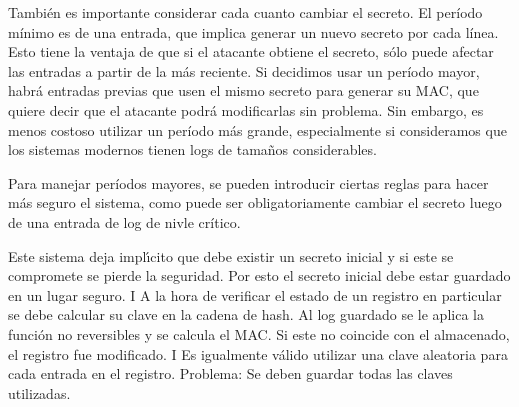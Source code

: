 También es importante considerar cada cuanto cambiar el secreto. El período mínimo es de una entrada, que implica generar un nuevo secreto por cada línea. Esto tiene la ventaja de que si el atacante obtiene el secreto, sólo puede afectar las entradas a partir de la más reciente. Si decidimos usar un período mayor, habrá entradas previas que usen el mismo secreto para generar su MAC, que quiere decir que el atacante podrá modificarlas sin problema. Sin embargo, es menos costoso utilizar un período más grande, especialmente si consideramos que los sistemas modernos tienen logs de tamaños considerables.

Para manejar períodos mayores, se pueden introducir ciertas reglas para hacer más seguro el sistema, como puede ser obligatoriamente cambiar el secreto luego de una entrada de log de nivle crítico.


Este sistema deja implı́cito que debe existir un secreto inicial y si
este se compromete se pierde la seguridad. Por esto el secreto inicial
debe estar guardado en un lugar seguro.
I A la hora de verificar el estado de un registro en particular se debe
calcular su clave en la cadena de hash. Al log guardado se le aplica
la función no reversibles y se calcula el MAC. Si este no coincide con
el almacenado, el registro fue modificado.
I Es igualmente válido utilizar una clave aleatoria para cada entrada en
el registro. Problema: Se deben guardar todas las claves utilizadas.